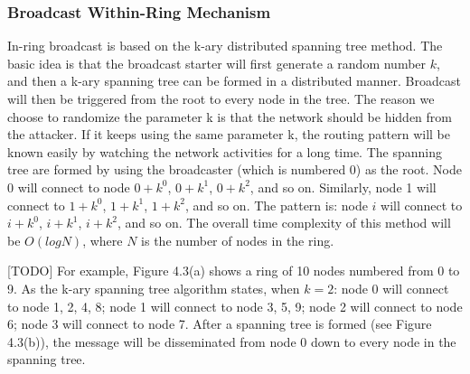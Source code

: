 \subsubsection{Broadcast Within-Ring Mechanism}

In-ring broadcast is based on the k-ary distributed spanning tree method. The basic idea is that the broadcast starter will first generate a random number $k$, and then a k-ary spanning tree can be formed in a distributed manner. Broadcast will then be triggered from the root to every node in the tree. The reason we choose to randomize the parameter k is that the network should be hidden from the attacker. If it keeps using the same parameter k, the routing pattern will be known easily by watching the network activities for a long time. The spanning tree are formed by using the broadcaster (which is numbered 0) as the root. Node 0 will connect to node $0+k^0$, $0+k^1$, $0+k^2$, and so on. Similarly, node 1 will connect to $1+k^0$, $1+k^1$, $1+k^2$, and so on. The pattern is: node $i$ will connect to $i+k^0$, $i+k^1$, $i+k^2$, and so on. The overall time complexity of this method will be $O(logN)$, where $N$ is the number of nodes in the ring.

[TODO] For example, Figure 4.3(a) shows a ring of 10 nodes numbered from 0 to 9. As the k-ary spanning tree algorithm states, when $k=2$: node 0 will connect to node 1, 2, 4, 8; node 1 will connect to node 3, 5, 9; node 2 will connect to node 6; node 3 will connect to node 7. After a spanning tree is formed (see Figure 4.3(b)), the message will be disseminated from node 0 down to every node in the spanning tree.

